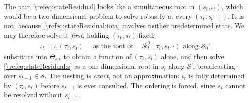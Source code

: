 The pair \eqref{\refeq:stateResidual} looks like a simultaneous root in $(s_t,\iota_t)$, which would be a two-dimensional problem to solve robustly at every $(\tau_t,s_{t-1})$. It is not, because \eqref{\refeq:stateResidual:iota} involves neither predetermined state. We may therefore solve it \emph{first}, holding $(\tau_t,s_t)$ fixed:
\begin{align}\label{\refeq:iotaOfTauS}
    \iota_t = \iota_t\left(\tau_t,s_t\right) \quad\text{ as the root of }\quad \mathcal{R}_t^0\left(\tau_t,s_t,\cdot\right)\text{ along } \mathcal{S}_0',
\end{align}
substitute into $\Theta_{s,t}$ to obtain a function of $(\tau_t,s_t)$ alone, and then solve \eqref{\refeq:stateResidual:s} as a one-dimensional root in $s_t$ along $\mathcal{S}'$, broadcasting over $s_{t-1}\in\mathcal{S}$. The nesting is \emph{exact}, not an approximation: $\iota_t$ is fully determined by $(\tau_t,s_t)$ before $s_{t-1}$ is ever consulted. The ordering is forced, since $s_t$ cannot be resolved without $s_{t-1}$.

